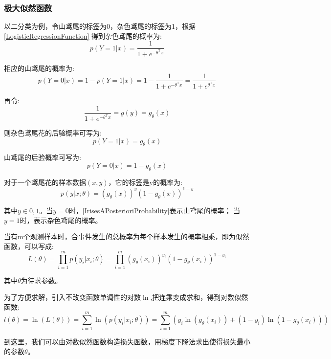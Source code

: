 \documentclass[UTF8]{article}
\begin{document}
\subsubsection{极大似然函数}
以二分类为例，令山鸢尾的标签为0，杂色鸢尾的标签为1，根据\eqref{LogisticRegressionFunction}
得到杂色鸢尾的概率为:
\begin{equation}
	p(Y=1|x)=\frac{1}{1+e^{-\theta^\mathsf{T} x}}
\end{equation}
\par
相应的山鸢尾的概率为:
\begin{equation}
	p(Y=0|x)=1-p(Y=1|x)=1-\frac{1}{1+e^{-\theta^\mathsf{T} x}}=
	\frac{1}{1+e^{\theta^\mathsf{T} x}}
\end{equation}
\par
再令:
\begin{equation}
	\frac{1}{1+e^{-\theta^\mathsf{T} x}}=g(y)=g_\theta (x)
\end{equation}
\par
则杂色鸢尾花的后验概率可写为:
\begin{equation}
	p(Y=1|x)=g_\theta (x)
\end{equation}
\par
山鸢尾的后验概率可写为:
\begin{equation}
	p(Y=0|x)=1-g_\theta (x)
\end{equation}
\par
对于一个鸢尾花的样本数据$(x,y)$，它的标签是y的概率为:
\begin{equation}
	p(y|x;\theta)=(g_\theta (x))^y(1-g_\theta (x))^{1-y}\label{IrisesAPosterioriProbability}
\end{equation}
\par
其中$y\in {0,1}$。当$y=0$时，\eqref{IrisesAPosterioriProbability}表示山鸢尾的概率；
当$y=1$时，表示杂色鸢尾的概率。
\par
当有m个观测样本时，合事件发生的总概率为每个样本发生的概率相乘，即为似然函数，可以写成:
\begin{equation}
	L(\theta)=\prod_{i=1}^{m}p(y_i|x_i;\theta)
	=\prod_{i=1}^{m}(g_\theta (x_i))^{y_i}(1-g_\theta (x_i))^{1-y_i}
\end{equation}
\par
其中$\theta$为待求参数。
\par
为了方便求解，引入不改变函数单调性的对数$\ln$,把连乘变成求和，得到对数似然函数:
\begin{equation}
	l(\theta)=\ln(L(\theta))=\sum_{i=1}^{m}\ln(p(y_i|x_i;\theta))
	=\sum_{i=1}^{m}(y_i\ln(g_\theta (x_i))+(1-y_i)\ln(1-g_\theta (x_i)))
\end{equation}
\par
到这里，我们可以由对数似然函数构造损失函数，用梯度下降法求出使得损失最小的参数$\theta$。
\end{document}
